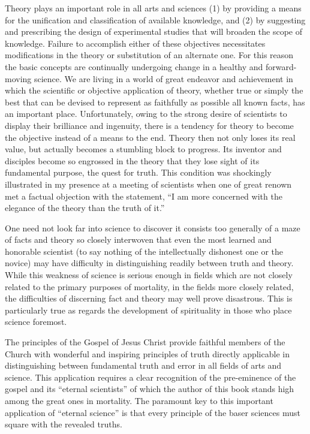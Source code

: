 Theory plays an important role in all arts and sciences (1) by providing a means for the
unification and classification of available knowledge, and (2) by suggesting and prescribing
the design of experimental studies that will broaden the scope of knowledge. Failure to
accomplish either of these objectives necessitates modifications in the theory or substitution
of an alternate one. For this reason the basic concepts are continually undergoing change in a
healthy and forward-moving science. We are living in a world of great endeavor and
achievement in which the scientific or objective application of theory, whether true or simply
the best that can be devised to represent as faithfully as possible all known facts, has an
important place. Unfortunately, owing to the strong desire of scientists to display their
brilliance and ingenuity, there is a tendency for theory to become the objective instead of a
means to the end. Theory then not only loses its real value, but actually becomes a stumbling
block to progress. Its inventor and disciples become so engrossed in the theory that they lose
sight of its fundamental purpose, the quest for truth. This condition was shockingly
illustrated in my presence at a meeting of scientists when one of great renown met a factual
objection with the statement, ``I am more concerned with the elegance of the theory than the
truth of it.''

One need not look far into science to discover it consists too generally of a maze of facts and
theory so closely interwoven that even the most learned and honorable scientist (to say
nothing of the intellectually dishonest one or the novice) may have difficulty in
distinguishing readily between truth and theory. While this weakness of science is serious
enough in fields which are not closely related to the primary purposes of mortality, in the
fields more closely related, the difficulties of discerning fact and theory may well prove
disastrous. This is particularly true as regards the development of spirituality in those who
place science foremost.

The principles of the Gospel of Jesus Christ provide faithful members of the Church with
wonderful and inspiring principles of truth directly applicable in distinguishing between
fundamental truth and error in all fields of arts and science. This application requires a clear
recognition of the pre-eminence of the gospel and its ``eternal scientists'' of which the author
of this book stands high among the great ones in mortality. The paramount key to this
important application of ``eternal science'' is that every principle of the baser sciences must
square with the revealed truths.

